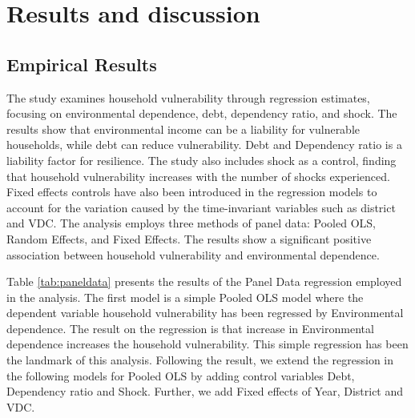 \clearpage
\section{Results and discussion} \label{isect4}

\subsection{Empirical Results}
The study examines household vulnerability through regression estimates, focusing on environmental dependence, debt, dependency ratio, and shock. The results show that environmental income can be a liability for vulnerable households, while debt can reduce vulnerability. Debt and Dependency ratio is a liability factor for resilience. The study also includes shock as a control, finding that household vulnerability increases with the number of shocks experienced. Fixed effects controls have also been introduced in the regression models to account for the variation caused by the time-invariant variables such as district and VDC. The analysis employs three methods of panel data: Pooled OLS, Random Effects, and Fixed Effects. The results show a significant positive association between household vulnerability and environmental dependence.

Table \ref{tab:paneldata} presents the results of the Panel Data regression employed in the analysis. The first model is a simple Pooled OLS model where the dependent variable household vulnerability has been regressed by Environmental dependence. The result on the regression is that increase in Environmental dependence increases the household vulnerability. This simple regression has been the landmark of this analysis. Following the result, we extend the regression in the following models for Pooled OLS by adding control variables Debt, Dependency ratio and Shock. Further, we add Fixed effects of Year, District and VDC.

